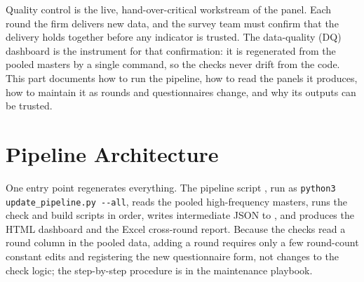 

Quality control is the live, hand-over-critical workstream of the panel. Each
round the firm delivers new data, and the survey team must confirm that the
delivery holds together before any indicator is trusted. The data-quality (DQ)
dashboard is the instrument for that confirmation: it is regenerated from the
pooled masters by a single command, so the checks never drift from the code.
This part documents how to run the pipeline, how to read the panels it
produces, how to maintain it as rounds and questionnaires change, and why its
outputs can be trusted.

\section{Pipeline Architecture}

\begin{sloppypar}
One entry point regenerates everything. The pipeline script
, run as \verb|python3 update_pipeline.py --all|,
reads the pooled high-frequency masters, runs the check and build scripts in
order, writes intermediate JSON to , and produces
the HTML dashboard and the Excel cross-round report. Because the checks read a
round column in the pooled data, adding a round requires only a few round-count
constant edits and registering the new questionnaire form, not changes to the
check logic; the step-by-step procedure is in the maintenance playbook.
\end{sloppypar}

